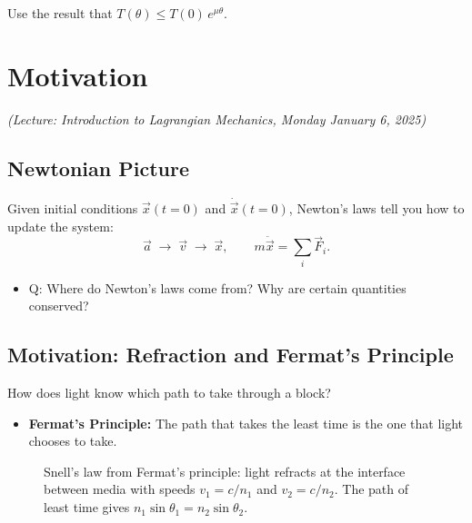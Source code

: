 Use the result that $T(\theta) \leq T(0)\,e^{\mu\theta}$.

\section{Motivation}

\textit{(Lecture: Introduction to Lagrangian Mechanics, Monday January 6, 2025)}

\subsection{Newtonian Picture}

Given initial conditions $\vec{x}(t=0)$ and $\dot{\vec{x}}(t=0)$, Newton's laws
tell you how to update the system:
\[
    \vec{a} \;\to\; \vec{v} \;\to\; \vec{x}, \qquad m\ddot{\vec{x}} = \sum_i \vec{F}_i.
\]

\begin{itemize}
    \item Q: Where do Newton's laws come from? Why are certain quantities conserved?
\end{itemize}

\subsection{Motivation: Refraction and Fermat's Principle}

How does light know which path to take through a block?

\begin{itemize}
    \item \textbf{Fermat's Principle:} The path that takes the least time is the one
        that light chooses to take.
\end{itemize}

\begin{figure}[H]
\begin{center}
\end{center}
\caption{Snell's law from Fermat's principle: light refracts at the interface between media with speeds $v_1 = c/n_1$ and $v_2 = c/n_2$. The path of least time gives $n_1\sin\theta_1 = n_2\sin\theta_2$.}
\label{fig:fermat_snell}
\end{figure}

